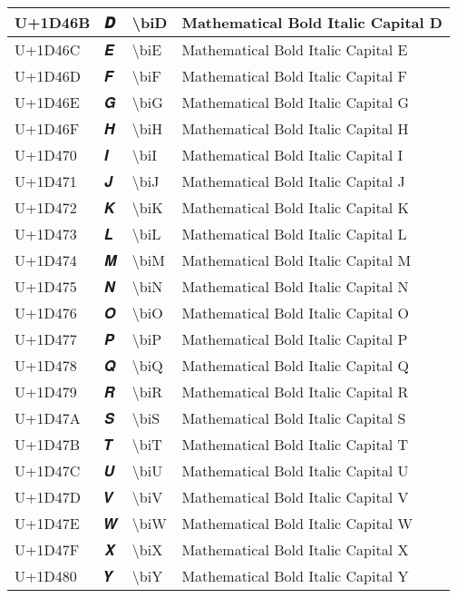 \begin{table}[h]
\begin{tabulary}{\linewidth}{|L|L|L|L|}
\hline
U+1D46B & 𝑫 & {\textbackslash}biD & Mathematical Bold Italic Capital D \\
\hline
U+1D46C & 𝑬 & {\textbackslash}biE & Mathematical Bold Italic Capital E \\
\hline
U+1D46D & 𝑭 & {\textbackslash}biF & Mathematical Bold Italic Capital F \\
\hline
U+1D46E & 𝑮 & {\textbackslash}biG & Mathematical Bold Italic Capital G \\
\hline
U+1D46F & 𝑯 & {\textbackslash}biH & Mathematical Bold Italic Capital H \\
\hline
U+1D470 & 𝑰 & {\textbackslash}biI & Mathematical Bold Italic Capital I \\
\hline
U+1D471 & 𝑱 & {\textbackslash}biJ & Mathematical Bold Italic Capital J \\
\hline
U+1D472 & 𝑲 & {\textbackslash}biK & Mathematical Bold Italic Capital K \\
\hline
U+1D473 & 𝑳 & {\textbackslash}biL & Mathematical Bold Italic Capital L \\
\hline
U+1D474 & 𝑴 & {\textbackslash}biM & Mathematical Bold Italic Capital M \\
\hline
U+1D475 & 𝑵 & {\textbackslash}biN & Mathematical Bold Italic Capital N \\
\hline
U+1D476 & 𝑶 & {\textbackslash}biO & Mathematical Bold Italic Capital O \\
\hline
U+1D477 & 𝑷 & {\textbackslash}biP & Mathematical Bold Italic Capital P \\
\hline
U+1D478 & 𝑸 & {\textbackslash}biQ & Mathematical Bold Italic Capital Q \\
\hline
U+1D479 & 𝑹 & {\textbackslash}biR & Mathematical Bold Italic Capital R \\
\hline
U+1D47A & 𝑺 & {\textbackslash}biS & Mathematical Bold Italic Capital S \\
\hline
U+1D47B & 𝑻 & {\textbackslash}biT & Mathematical Bold Italic Capital T \\
\hline
U+1D47C & 𝑼 & {\textbackslash}biU & Mathematical Bold Italic Capital U \\
\hline
U+1D47D & 𝑽 & {\textbackslash}biV & Mathematical Bold Italic Capital V \\
\hline
U+1D47E & 𝑾 & {\textbackslash}biW & Mathematical Bold Italic Capital W \\
\hline
U+1D47F & 𝑿 & {\textbackslash}biX & Mathematical Bold Italic Capital X \\
\hline
U+1D480 & 𝒀 & {\textbackslash}biY & Mathematical Bold Italic Capital Y \\

\end{tabulary}
\end{table}
